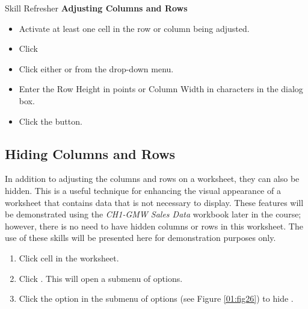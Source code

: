 \begin{center}
	\begin{sklbox}{Skill Refresher}
		\textbf{Adjusting Columns and Rows}
		\\
		\begin{itemize}
			\setlength{\itemsep}{0pt}
			\setlength{\parskip}{0pt}
			\setlength{\parsep}{0pt}
			
			\item Activate at least one cell in the row or column being adjusted.
			\item Click 
			\item Click either  or  from the drop-down menu.
			\item Enter the Row Height in points or Column Width in characters in the dialog box.
			\item Click the  button.
			
		\end{itemize}
	\end{sklbox}
\end{center}

\subsection{Hiding Columns and Rows}

In addition to adjusting the columns and rows on a worksheet, they can also be hidden. This is a useful technique for enhancing the visual appearance of a worksheet that contains data that is not necessary to display. These features will be demonstrated using the \textit{CH1-GMW Sales Data} workbook later in the course; however, there is no need to have hidden columns or rows in this worksheet. The use of these skills will be presented here for demonstration purposes only.

\begin{enumerate}
	\item Click cell  in the  worksheet.
	\item Click . This will open a submenu of options.
	\item Click the  option in the submenu of options (see Figure \ref{01:fig26}) to hide .
\end{enumerate}


